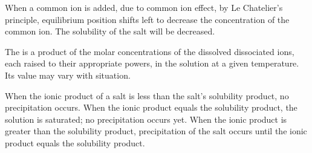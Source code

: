 \documentclass[Chemistry.tex]{subfiles}
\begin{document}
When a common ion is added, due to common ion effect, by Le Chatelier's principle, equilibrium position shifts left to decrease the concentration of the common ion. The solubility of the salt will be decreased.

The  is a product of the molar concentrations of the dissolved dissociated ions, each raised to their appropriate powers, in the solution at a given temperature. Its value may vary with situation.

When the ionic product of a salt is less than the salt's solubility product, no precipitation occurs. When the ionic product equals the solubility product, the solution is saturated; no precipitation occurs yet. When the ionic product is greater than the solubility product, precipitation of the salt occurs until the ionic product equals the solubility product.
\end{document}

